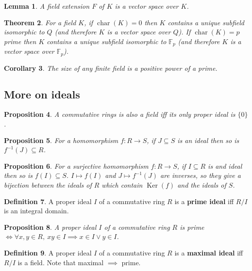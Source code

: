 \documentclass[12pt]{article}
\newtheorem{thm}{Theorem}[section]
\newtheorem{lem}[thm]{Lemma}
\newtheorem{cor}[thm]{Corollary}
\newtheorem{prop}[thm]{Proposition}
\theoremstyle{definition}
\newtheorem{defn}[thm]{Definition}
\newcommand{\F}{\mathbb{F}}
\DeclareMathOperator{\Ker}{Ker}
\DeclareMathOperator{\chr}{char}
\begin{document}
\begin{lem}
  A field extension $F$ of $K$ is a vector space over $K$.
\end{lem}

\begin{thm}
  For a field $K$, if $\chr(K) = 0$ then $K$ contains a unique subfield isomorphic to $Q$ (and therefore $K$ is a vector space over $Q$).
  If $\chr(K) = p$ prime then $K$ contains a unique subfield isomorphic to $\F_p$ (and therefore $K$ is a vector space over $\F_p$).
\end{thm}

\begin{cor}
  The size of any finite field is a positive power of a prime.
\end{cor}

\subsection{More on ideals}

\begin{prop}
  A commutative rings is also a field iff its only proper ideal is $\{0\}$.
\end{prop}

\begin{prop}
  For a homomorphism $f : R \to S$, if $J \subseteq S$ is an ideal then so is $f^{-1}(J) \subseteq R$.
\end{prop}

\begin{prop}
  For a surjective homomorphism $f : R \to S$, if $I \subseteq R$ is and ideal then so is $f(I) \subseteq S$. 
  $I \mapsto f(I)$ and $J \mapsto f^{-1}(J)$ are inverses, so they give a bijection between the ideals of $R$ which contain $\Ker(f)$ and the ideals of $S$.
\end{prop}

\begin{defn}
  A proper ideal $I$ of a commutative ring $R$ is a \textbf{prime ideal} iff $R / I$ is an integral domain.
\end{defn}

\begin{prop}
  A proper ideal $I$ of a commutative ring $R$ is prime $\iff \forall x, y \in R,\ xy \in I \implies x \in I \lor y \in I$.
\end{prop}

\begin{defn}
  A proper ideal $I$ of a commutative ring $R$ is a \textbf{maximal ideal} iff $R / I$ is a field.
  Note that maximal $\implies$ prime.
\end{defn}
\end{document}
